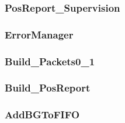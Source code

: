 \subsubsection{PosReport\_Supervision}


\subsubsection{ErrorManager}


\subsubsection{Build\_Packets0\_1}


\subsubsection{Build\_PosReport}


\subsubsection{AddBGToFIFO}


